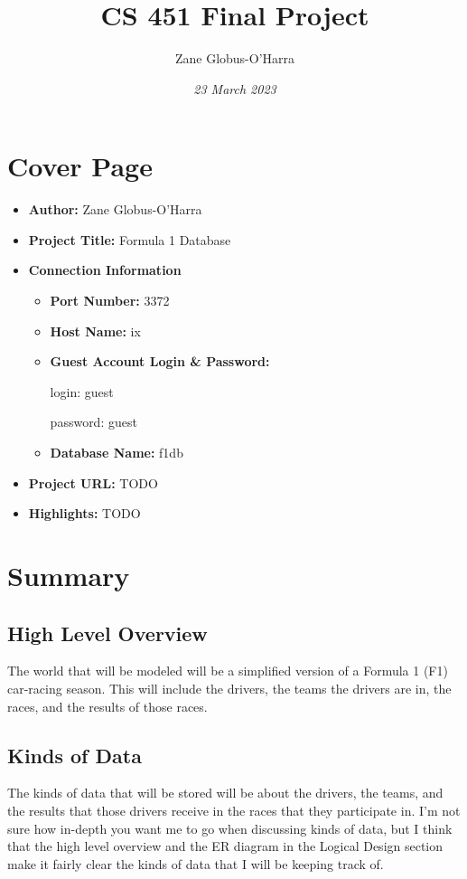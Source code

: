 \documentclass{article} %
\title{CS 451 Final Project}
\author{Zane Globus-O'Harra}
\date{\textit{23 March 2023}}
\begin{document}
\maketitle

\section{Cover Page}

\begin{itemize}
    \item \textbf{Author:} Zane Globus-O'Harra
    
    \item \textbf{Project Title:} Formula 1 Database

    \item \textbf{Connection Information}
    \begin{itemize}
        \item \textbf{Port Number:} 3372

        \item \textbf{Host Name:} ix

        \item \textbf{Guest Account Login \& Password:} 

        login: guest 

        password: guest 

        \item \textbf{Database Name:} f1db

    \end{itemize}

    \item \textbf{Project URL:} TODO

    \item \textbf{Highlights:} TODO
\end{itemize}

\section{Summary}

\subsection{High Level Overview}
The world that will be modeled will be a simplified version of a Formula
1 (F1) car-racing season. This will include the drivers, the teams the
drivers are in, the races, and the results of those races. 

\subsection{Kinds of Data}
The kinds of data that will be stored will be about the drivers, the
teams, and the results that those drivers receive in the races that they
participate in. I'm not sure how in-depth you want me to go when
discussing kinds of data, but I think that the high level overview and
the ER diagram in the Logical Design section make it fairly clear the
kinds of data that I will be keeping track of. 
\end{document}
